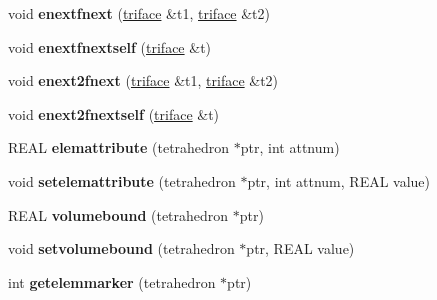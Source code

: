 \begin{DoxyCompactItemize}
\item 
\hypertarget{classtetgenmesh_aef216fba62de4660d49485887c033f1e}{void {\bfseries enextfnext} (\hyperlink{classtetgenmesh_1_1triface}{triface} \&t1, \hyperlink{classtetgenmesh_1_1triface}{triface} \&t2)}\label{classtetgenmesh_aef216fba62de4660d49485887c033f1e}

\item 
\hypertarget{classtetgenmesh_a8f3bacddf8acc87453cb4e9675a40c4a}{void {\bfseries enextfnextself} (\hyperlink{classtetgenmesh_1_1triface}{triface} \&t)}\label{classtetgenmesh_a8f3bacddf8acc87453cb4e9675a40c4a}

\item 
\hypertarget{classtetgenmesh_af9e5141160c35d6d5a2601951077af7b}{void {\bfseries enext2fnext} (\hyperlink{classtetgenmesh_1_1triface}{triface} \&t1, \hyperlink{classtetgenmesh_1_1triface}{triface} \&t2)}\label{classtetgenmesh_af9e5141160c35d6d5a2601951077af7b}

\item 
\hypertarget{classtetgenmesh_a6581cffd457b3d0abb33cae81a2306eb}{void {\bfseries enext2fnextself} (\hyperlink{classtetgenmesh_1_1triface}{triface} \&t)}\label{classtetgenmesh_a6581cffd457b3d0abb33cae81a2306eb}

\item 
\hypertarget{classtetgenmesh_abffbd551714f2e119e0f8ba3e4e54c92}{R\-E\-A\-L {\bfseries elemattribute} (tetrahedron $\ast$ptr, int attnum)}\label{classtetgenmesh_abffbd551714f2e119e0f8ba3e4e54c92}

\item 
\hypertarget{classtetgenmesh_a0a648fdfb850a6d706e96bf62a18f761}{void {\bfseries setelemattribute} (tetrahedron $\ast$ptr, int attnum, R\-E\-A\-L value)}\label{classtetgenmesh_a0a648fdfb850a6d706e96bf62a18f761}

\item 
\hypertarget{classtetgenmesh_acbf906f467a4da46e7f89812cef268d7}{R\-E\-A\-L {\bfseries volumebound} (tetrahedron $\ast$ptr)}\label{classtetgenmesh_acbf906f467a4da46e7f89812cef268d7}

\item 
\hypertarget{classtetgenmesh_a33453f3a5320ecc48f25630a97c5e353}{void {\bfseries setvolumebound} (tetrahedron $\ast$ptr, R\-E\-A\-L value)}\label{classtetgenmesh_a33453f3a5320ecc48f25630a97c5e353}

\item 
\hypertarget{classtetgenmesh_ad6dd7c15ea4b426c1157e00e41b4f4fc}{int {\bfseries getelemmarker} (tetrahedron $\ast$ptr)}\label{classtetgenmesh_ad6dd7c15ea4b426c1157e00e41b4f4fc}


\end{DoxyCompactItemize}
